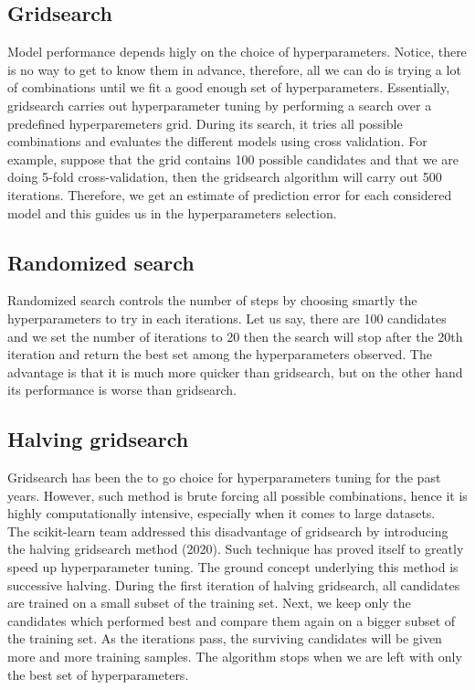 \subsection{Gridsearch}
Model performance depends higly on the choice of hyperparameters. Notice, there is no way to get to know them in advance, therefore, all we can do is trying a lot of combinations until we fit a good enough set of hyperparameters. Essentially, gridsearch carries out hyperparameter tuning by performing a search over a predefined hyperparemeters grid. During its search, it tries all possible combinations and evaluates the different models %
using cross validation. For example, suppose that the grid contains 100 possible candidates and that we are doing 5-fold cross-validation, then the gridsearch algorithm will carry out 500 iterations.
Therefore, we get an estimate of prediction error for each considered model and this guides us in the hyperparameters selection.

\subsection{Randomized search}
Randomized search controls the number of steps by choosing smartly the hyperparameters to try in each iterations.
Let us say, there are 100 candidates and we set the number of iterations to 20 then the search will stop after the 20th iteration and return the best set among the hyperparameters observed.
The advantage is that it is much more quicker than gridsearch, but on the other hand its performance is worse than gridsearch.

\subsection{Halving gridsearch}
Gridsearch has been the to go choice for hyperparameters tuning for the past years. However, such method is brute forcing all possible combinations, hence it is highly computationally intensive, especially when it comes to large datasets.
\\
The scikit-learn team addressed this disadvantage of gridsearch by introducing the halving gridsearch method  (2020). Such technique has proved itself to greatly speed up hyperparameter tuning.
The ground concept underlying this method is successive halving. During the first iteration of halving gridsearch, all candidates are trained on a small subset of the training set. Next, we keep only the candidates which performed best and compare  them again on a bigger subset of the training set. As the iterations pass, the surviving candidates will be given more and more training samples. The algorithm stops when we are left with only the best set of hyperparameters.

